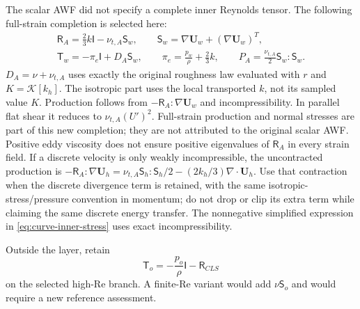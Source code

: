 \documentclass[11pt,a4paper]{article}
\numberwithin{equation}{section}
\newcommand{\R}{\mathsf{R}}
\newcommand{\I}{\mathsf{I}}
\newcommand{\Sm}{\mathsf{S}}
\begin{document}
The scalar AWF did not specify a complete inner Reynolds tensor. The
following full-strain completion is selected here:
\begin{equation}
 \begin{gathered}
 \R_A=\tfrac23k\I-\nu_{t,A}\Sm_w,\qquad
 \Sm_w=\nabla\bm U_w+(\nabla\bm U_w)^T,\\
 \boxed{\mathsf T_w=-\pi_e\I+D_A\Sm_w,
 \qquad \pi_e=\frac{p_w}{\rho}+\tfrac23k,\qquad
 P_A=\frac{\nu_{t,A}}2\Sm_w:\Sm_w.}
 \end{gathered}
 \label{eq:curve-inner-stress}
\end{equation}
$D_A=\nu+\nu_{t,A}$ uses exactly the original roughness law evaluated
with $r$ and $K=\mathcal K[k_h]$. The isotropic part uses the local
transported $k$, not its sampled value $K$. Production follows from
$-\R_A:\nabla\bm U_w$ and incompressibility. In parallel flat shear
it reduces to $\nu_{t,A}(U')^2$. Full-strain production and normal
stresses are part of this new completion; they are not attributed to
the original scalar AWF. Positive eddy viscosity does not ensure
positive eigenvalues of $\R_A$ in every strain field.
If a discrete velocity is only weakly incompressible, the uncontracted
production is
$-\R_A:\nabla\bm U_h
=\nu_{t,A}\Sm_h:\Sm_h/2-(2k_h/3)\nabla\cdot\bm U_h$.
Use that contraction when the discrete divergence term is retained,
with the same isotropic-stress/pressure convention in momentum; do not
drop or clip its extra term while claiming the same discrete energy
transfer. The nonnegative simplified expression in
\cref{eq:curve-inner-stress} uses exact incompressibility.

Outside the layer, retain
\begin{equation}
 \mathsf T_o=-\frac{p_o}{\rho}\I-\R_{CLS}
 \label{eq:curve-outer-stress}
\end{equation}
on the selected high-Re branch. A finite-Re variant would add
$\nu\Sm_o$ and would require a new reference assessment.
\end{document}
